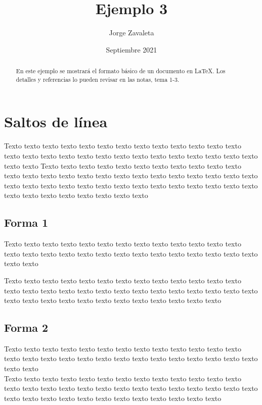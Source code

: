 \documentclass{article}
\title{Ejemplo 3}
\author{Jorge Zavaleta }
\date{Septiembre 2021}
\begin{document}
\maketitle
\tableofcontents

\begin{abstract}
    En este ejemplo se mostrará el formato básico de un documento en \LaTeX{}. Los detalles y referencias lo pueden revisar en las notas, tema 1-3.
\end{abstract}

\section{Saltos de línea}

Texto texto texto texto texto texto texto texto texto texto texto texto texto texto texto texto texto texto texto texto texto texto texto texto texto texto texto texto texto 
Texto texto texto texto texto texto texto texto texto texto texto texto texto texto texto texto texto texto texto texto texto texto texto texto texto texto texto texto texto texto texto texto texto texto texto texto texto texto texto texto texto texto texto texto texto texto texto

\subsection{Forma 1}
Texto texto texto texto texto texto texto texto texto texto texto texto texto texto texto texto texto texto texto texto texto texto texto texto texto texto texto texto texto 

Texto texto texto texto texto texto texto texto texto texto texto texto texto texto texto texto texto texto texto texto texto texto texto texto texto texto texto texto texto texto texto texto texto texto texto texto texto texto texto 

\subsection{Forma 2}
Texto texto texto texto texto texto texto texto texto texto texto texto texto texto texto texto texto texto texto texto texto texto texto texto texto texto texto texto texto\\

Texto texto texto texto texto texto texto texto texto texto texto texto texto texto texto texto texto texto texto texto texto texto texto texto texto texto texto texto texto texto texto texto texto texto texto texto texto texto texto 
\end{document}
